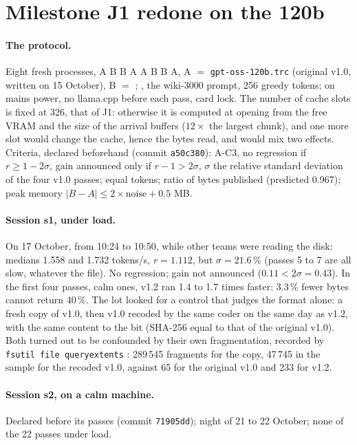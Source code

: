 \section{Milestone J1 redone on the 120b}\label{t3cod:sec:j1}

\paragraph{The protocol.} Eight fresh processes, A B B A A B B A, A $=$ \texttt{gpt-oss-120b.trc} (original v1.0, written on 15 October), B $=$ ; , the wiki-3000 prompt, 256 greedy tokens; on mains power, no llama.cpp before each pass, card lock. The number of cache slots is fixed at 326, that of J1: otherwise it is computed at opening from the free VRAM and the size of the arrival buffers ($12 \times$ the largest chunk), and one more slot would change the cache, hence the bytes read, and would mix two effects. Criteria, declared beforehand (commit \texttt{a50c380}): A-C3, no regression if $r \ge 1 - 2\sigma$, gain announced only if $r - 1 > 2\sigma$, $\sigma$ the relative standard deviation of the four v1.0 passes; equal tokens; ratio of bytes published (predicted 0.967); peak memory $|B - A| \le 2 \times \text{noise} + 0.5$ MB.

\paragraph{Session s1, under load.} On 17 October, from 10:24 to 10:50, while other teams were reading the disk: medians 1.558 and 1.732 tokens/s, $r = 1.112$, but $\sigma = 21.6\,\%$ (passes 5 to 7 are all slow, whatever the file). No regression; gain not announced ($0.11 < 2\sigma = 0.43$). In the first four passes, calm ones, v1.2 ran 1.4 to 1.7 times faster: 3.3\,\% fewer bytes cannot return 40\,\%. The lot looked for a control that judges the format alone: a fresh copy of v1.0, then v1.0 recoded by the same coder on the same day as v1.2, with the same content to the bit (SHA-256 equal to that of the original v1.0). Both turned out to be confounded by their own fragmentation, recorded by \texttt{fsutil file queryextents} \parencite{ms2018retrievalpointers}: 289\,545 fragments for the copy, 47\,745 in the sample for the recoded v1.0, against 65 for the original v1.0 and 233 for v1.2.

\paragraph{Session s2, on a calm machine.} Declared before its passes (commit \texttt{71905dd}); night of 21 to 22 October; none of the 22 passes under load.

